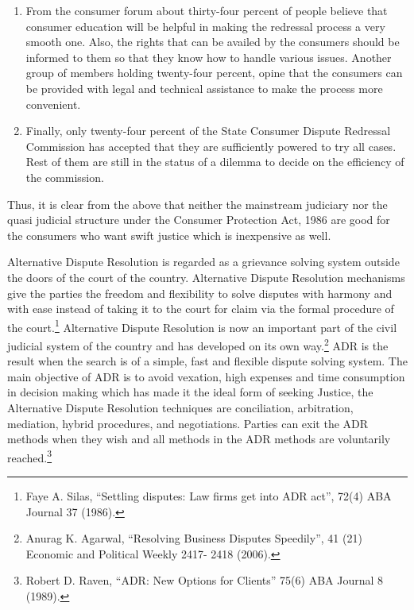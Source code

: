 \begin{multicols}{2}
\begin{enumerate}[label=$\bullet$]
\item From the consumer forum about thirty-four percent of people believe that consumer
education will be helpful in making the redressal process a very smooth one. Also, the
rights that can be availed by the consumers should be informed to them so that they
know how to handle various issues. Another group of members holding twenty-four
percent, opine that the consumers can be provided with legal and technical assistance
to make the process more convenient.

\item Finally, only twenty-four percent of the State Consumer Dispute Redressal
Commission has accepted that they are sufficiently powered to try all cases. Rest of
them are still in the status of a dilemma to decide on the efficiency of the commission.
\end{enumerate}

\noi
Thus, it is clear from the above that neither the mainstream judiciary nor the quasi judicial
structure under the Consumer Protection Act, 1986 are good for the consumers who want swift
justice which is inexpensive as well.


\noi
Alternative Dispute Resolution is regarded as a grievance solving system outside the doors of
the court of the country. Alternative Dispute Resolution mechanisms give the parties the
freedom and flexibility to solve disputes with harmony and with ease instead of taking it to the court for claim via the formal procedure of the court.\footnote{Faye A. Silas, “Settling disputes: Law firms get into ADR act”, 72(4) ABA Journal 37 (1986).} Alternative Dispute Resolution is now
an important part of the civil judicial system of the country and has developed on its own
way.\footnote{Anurag K. Agarwal, “Resolving Business Disputes Speedily”, 41 (21) Economic and Political Weekly 2417- 2418 (2006).} ADR is the result when the search is of a simple, fast and flexible dispute solving system.
The main objective of ADR is to avoid vexation, high expenses and time consumption in
decision making which has made it the ideal form of seeking Justice, the Alternative Dispute
Resolution techniques are conciliation, arbitration, mediation, hybrid procedures, and
negotiations. Parties can exit the ADR methods when they wish and all methods in the ADR
methods are voluntarily reached.\footnote{Robert D. Raven, “ADR: New Options for Clients” 75(6) ABA Journal 8 (1989).}


\end{multicols}
